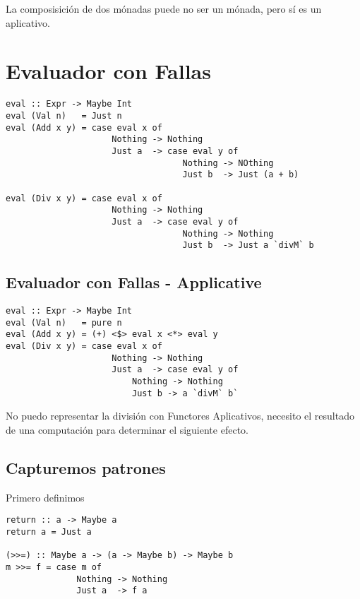 \documentclass{article}
\begin{document}
La composisición de dos mónadas puede no ser un mónada, pero sí es un aplicativo.

\newpage

\section{Evaluador con Fallas}

\begin{lstlisting}
eval :: Expr -> Maybe Int
eval (Val n)   = Just n
eval (Add x y) = case eval x of
                     Nothing -> Nothing
                     Just a  -> case eval y of
                                   Nothing -> NOthing
                                   Just b  -> Just (a + b)

eval (Div x y) = case eval x of
                     Nothing -> Nothing
                     Just a  -> case eval y of
                                   Nothing -> Nothing
                                   Just b  -> Just a `divM` b
\end{lstlisting}

\subsection{Evaluador con Fallas - Applicative}

\begin{lstlisting}
eval :: Expr -> Maybe Int
eval (Val n)   = pure n
eval (Add x y) = (+) <$> eval x <*> eval y
eval (Div x y) = case eval x of
                     Nothing -> Nothing
                     Just a  -> case eval y of
                         Nothing -> Nothing 
                         Just b -> a `divM` b`
\end{lstlisting}

No puedo representar la división con Functores Aplicativos, necesito el resultado de una computación para determinar el siguiente efecto.


\subsection{Capturemos patrones}

Primero definimos

\begin{lstlisting}
return :: a -> Maybe a
return a = Just a

(>>=) :: Maybe a -> (a -> Maybe b) -> Maybe b
m >>= f = case m of
              Nothing -> Nothing
              Just a  -> f a
\end{lstlisting}
\end{document}
